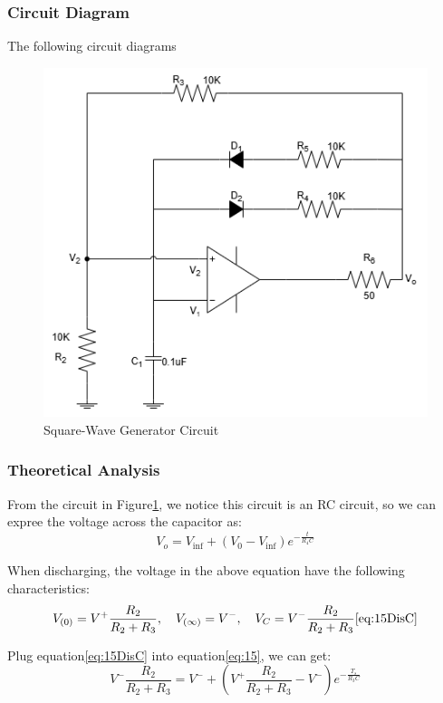     \subsubsection{Circuit Diagram}
        The following circuit diagrams 
        \begin{figure}[H]
            \centering
                \includegraphics[width=0.6\linewidth]{Experiment_15/Circuit/Lab15.drawio.png}
                \caption{Square-Wave Generator Circuit}
                \label{cir:15}
        \end{figure}

    \subsubsection{Theoretical Analysis}
        From the circuit in Figure\ref{cir:15}, we notice this circuit is an RC circuit, so we can expree the voltage across the capacitor as:
        \begin{equation}
            V_{o} = V_{\inf} + (V_{0}-V_{\inf})e^{-\frac{t}{R_4C}}
            \label{eq:15}
        \end{equation}

        When discharging, the voltage in the above equation have the following characteristics:
            \begin{equation}
                V_{(0)} = V^+ \frac{R_2}{R_2 + R_3}, \quad V_{(\infty)} = V^-, \quad V_C = V^- \frac{R_2}{R_2 + R_3}
                \ref{eq:15DisC}
            \end{equation}
        
        Plug equation\ref{eq:15DisC} into equation\ref{eq:15}, we can get:
            \begin{equation}
                V^- \frac{R_2}{R_2 + R_3} = V^- + \left( V^+ \frac{R_2}{R_2 + R_3} - V^- \right) e^{-\frac{T_s}{R_3C}}
                \label{eq:15a}
            \end{equation}

